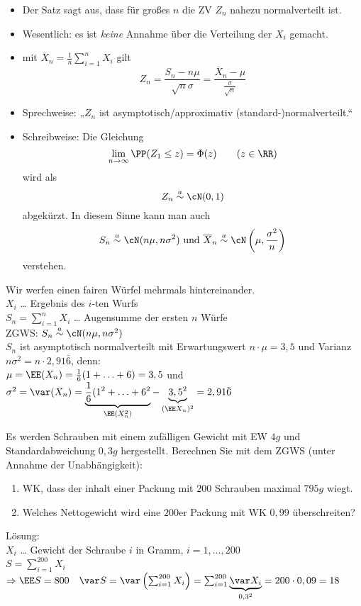 \documentclass{scrreprt}
\renewenvironment{anumerate}{\begin{enumerate}[label=(\alph*)]}{\end{enumerate}} %
\begin{document}
\begin{itemize}
\item Der Satz sagt aus, dass für großes $n$ die ZV $Z_n$ nahezu normalverteilt ist.
\item Wesentlich: es ist \emph{keine} Annahme über die Verteilung der $X_i$ gemacht.
\item mit $\overline{X}_n = \frac{1}{n}\sum_{i=1}^n X_i$ gilt
$$Z_n=\frac{S_n - n \mu}{\sqrt{n}\sigma} = \frac{\overline{X}_n - \mu}{\frac{\sigma}{\sqrt{n}}}$$
\item Sprechweise: „$Z_n$ ist asymptotisch/approximativ (standard-)normalverteilt.“
\item Schreibweise: Die Gleichung
$$\lim_{n\to \infty} \PP(Z_1 \leq z) = \Phi (z) \qquad (z \in \RR)$$
wird als 
$$Z_n \overset{a}{\sim}\cN (0,1)$$
abgekürzt. In diesem Sinne kann man auch 
$$S_n \overset{a}{\sim} \cN(n \mu, n \sigma^2) \text{ und } \overline{X}_n\overset{a}{\sim}\cN\left(\mu, \frac{\sigma^2}{n}\right)$$
verstehen.
\end{itemize}

 Wir werfen einen fairen Würfel mehrmals hintereinander.\\
$X_i$ … Ergebnis des $i$-ten Wurfs\\
$S_n = \sum_{i=1}^n X_i$ … Augensumme der ersten $n$ Würfe\\
ZGWS: $S_n \overset{a}{\sim} \cN (n \mu, n\sigma^2)$\\
$S_n$ ist asymptotisch normalverteilt mit Erwartungswert $n \cdot \mu =3,5$ und Varianz $n\sigma^2 = n \cdot 2,91\bar 6$, denn: \\
$\mu = \EE(X_n) = \frac{1}{6}(1+\ldots+6)=3,5$ und \\
$\sigma^2=\var(X_n)=\underbrace{\frac{1}{6}(1^2+\ldots + 6^2}_{\EE(X_n^2)}-\underbrace{3,5^2}_{(\EE X_n)^2}=2,91\bar 6$

 Es werden Schrauben mit einem zufälligen Gewicht mit EW $4\unit{g}$ und Standardabweichung $0,3\unit{g}$ hergestellt. Berechnen Sie mit dem ZGWS (unter Annahme der Unabhängigkeit):
\begin{anumerate}
\item WK, dass der inhalt einer Packung mit $200$ Schrauben maximal $795\unit{g}$ wiegt.\label{itm:1.4-10-a}
\item Welches Nettogewicht wird eine $200$er Packung mit WK $0,99$ überschreiten?\label{itm:1.4-10-b}
\end{anumerate}
Lösung:\\
$X_i$ … Gewicht der Schraube $i$ in Gramm, $i=1,\ldots, 200$\\
$S=\sum_{i=1}^{200} X_i$\\
$\Rightarrow \EE S = 800 \quad \var S = \var \left( \sum_{i=1}^{200} X_i\right)=\sum_{i=1}^{200} \underbrace{\var X_i}_{0,3^2} = 200 \cdot 0,09 = 18$
\end{document}
